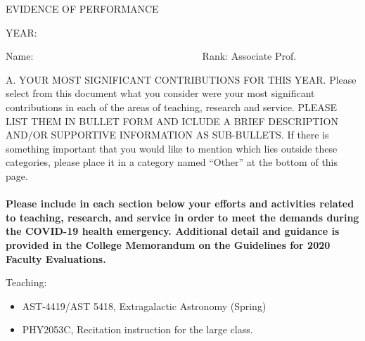 \addtolength{\topmargin}{-.5in}
\addtolength{\textheight}{2.5cm}
\addtolength{\oddsidemargin}{-.75in}
\addtolength{\evensidemargin}{-.75in}
\addtolength{\textwidth}{.5in}


\centerline{EVIDENCE OF PERFORMANCE}
\bigskip
\centerline{YEAR: }
\bigskip
\noindent Name: 
\hbox{\ \ \ \ \ \ \ \
\ \ \ \ \ \ \ \ \ \ \ \ \ \ \ \ \ \ \ \ \ \ \ \ \ }
Rank: \underbar
{Associate Prof. }

\vskip 20pt

\noindent A. YOUR MOST SIGNIFICANT CONTRIBUTIONS FOR THIS YEAR.
Please select from this document what you consider were your most
significant contributions in each of the areas of teaching, research
and service. PLEASE LIST THEM IN BULLET FORM AND ICLUDE A BRIEF 
DESCRIPTION AND/OR SUPPORTIVE INFORMATION AS SUB-BULLETS. 
If there is something important that you would like to mention which
lies outside these categories, please
place it in a category named ``Other'' at the bottom of this page. \\ \\

{\bf Please include in each section below your efforts and activities related to teaching, research, and service in order to meet the demands during the COVID-19 health emergency. Additional detail and guidance is provided in the College Memorandum on the Guidelines for 2020 Faculty Evaluations.}


\vskip 10pt
\noindent
Teaching:
\begin{itemize}
    \item AST-4419/AST 5418, Extragalactic Astronomy (Spring)
    \item PHY2053C, Recitation instruction for the large class.
\end{itemize}
\vskip 30pt

